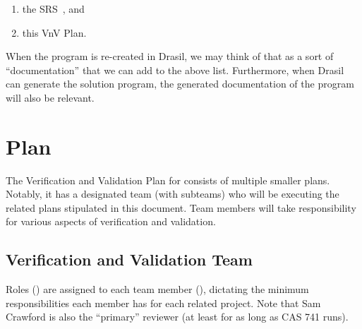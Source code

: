 \documentclass[12pt, titlepage]{article}
\begin{document}
\begin{enumerate}

    \item the SRS~\cite{BalaciBeamBendingSRS2023}, and

    \item this VnV Plan.

\end{enumerate}

\noindent{}When the \progname{} program is re-created in Drasil, we may think of
that as a sort of ``documentation'' that we can add to the above list.
Furthermore, when Drasil can generate the solution program, the generated
documentation of the program will also be relevant.

\newpage{}

\section{Plan}

The Verification and Validation Plan for \progname{} consists of multiple
smaller plans. Notably, it has a designated team (with subteams) who will be
executing the related plans stipulated in this document. Team members will take
responsibility for various aspects of verification and validation.

\subsection{Verification and Validation Team}

Roles () are assigned to each team member
(), dictating the minimum responsibilities each member
has for each related project. Note that Sam Crawford is also the ``primary''
reviewer (at least for as long as CAS 741 runs).
\end{document}
